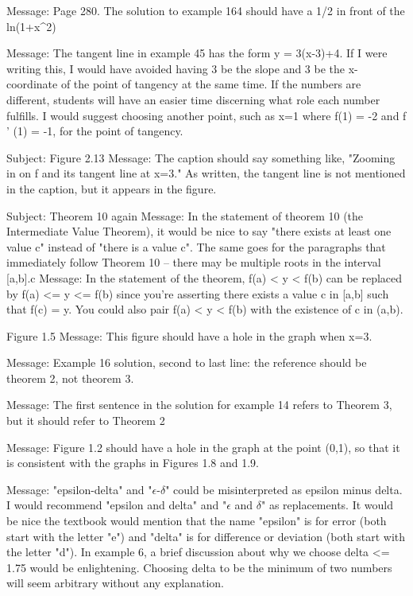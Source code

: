 {Message: Page 280. The solution to example 164 should have a 1/2 in front of the ln(1+x^2)

Message: The tangent line in example 45 has the form y = 3(x-3)+4. If I were writing this, I would have avoided having 3 be the slope and 3 be the x-coordinate of the point of tangency at the same time. If the numbers are different, students will have an easier time discerning what role each number fulfills. I would suggest choosing another point, such as x=1 where f(1) = -2 and f ' (1) = -1, for the point of tangency.

Subject: Figure 2.13   Message: The caption should say something like, "Zooming in on f and its tangent line at x=3." As written, the tangent line is not mentioned in the caption, but it appears in the figure.

Subject: Theorem 10 again  Message: In the statement of theorem 10 (the Intermediate Value Theorem), it would be nice to say "there exists at least one value c" instead of "there is a value c". The same goes for the paragraphs that immediately follow Theorem 10 -- there may be multiple roots in the interval [a,b].c    Message: In the statement of the theorem, f(a) < y < f(b) can be replaced by f(a) <= y <= f(b) since you're asserting there exists a value c in [a,b] such that f(c) = y. You could also pair f(a) < y < f(b) with the existence of c in (a,b).

Figure 1.5   Message: This figure should have a hole in the graph when x=3.

Message: Example 16 solution, second to last line: the reference should be theorem 2, not theorem 3.

Message: The first sentence in the solution for example 14 refers to Theorem 3, but it should refer to Theorem 2

Message: Figure 1.2 should have a hole in the graph at the point (0,1), so that it is consistent with the graphs in Figures 1.8 and 1.9.

Message: "epsilon-delta" and "$\epsilon$-$\delta$" could be misinterpreted as epsilon minus delta. I would recommend "epsilon and delta" and "$\epsilon$ and $\delta$" as replacements.       
It would be nice the textbook would mention that the name "epsilon" is for error (both start with the letter "e") and "delta" is for difference or deviation (both start with the letter "d").       
In example 6, a brief discussion about why we choose delta <= 1.75 would be enlightening. Choosing delta to be the minimum of two numbers will seem arbitrary without any explanation.

}
